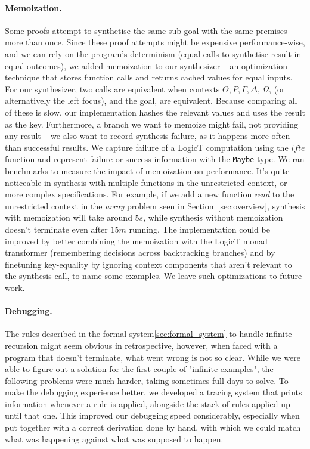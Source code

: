 \documentclass{llncs}
\newcommand{\mypara}[1]{\paragraph{\textbf{#1}.}}
\def\Rho{P}
\begin{document}
\mypara{Memoization} Some proofs attempt to synthetise the same
sub-goal with the same premises more than once. Since these proof
attempts might be expensive performance-wise, and we can rely on the
program's determinism (equal calls to synthetise result in equal
outcomes), we added memoization to our synthesizer -- an optimization
technique that stores function calls and returns cached values for
equal inputs.
%
For our synthesizer, two calls are equivalent when
contexts $\Theta, \Rho, \Gamma, \Delta$, $\Omega$, (or alternatively
the left focus), and the goal, are equivalent. Because comparing all
of these is slow, our implementation hashes the relevant values and
uses the result as the key.
%
Furthermore, a branch we want to memoize
might fail, not providing any result -- we also want to record
synthesis failure, as it happens more often than successful
results. We capture failure of a LogicT computation using the $\mathit{ifte}$
function and represent failure or success information with the \texttt{Maybe}
type. We ran benchmarks to measure the impact of memoization on 
performance. It's quite noticeable in synthesis with multiple
functions in the unrestricted context, or more complex
specifications. For example, if we add a new function \emph{read} to
the unrestricted context in the \emph{array} problem seen in
Section~\ref{sec:overview}, synthesis with memoization will take
around $5s$, while synthesis without memoization doesn't terminate
even after $15m$ running.
%
The implementation could be improved by better combining the
memoization with the LogicT monad transformer (remembering decisions across
backtracking branches) and by finetuning key-equality by ignoring context
components that aren't relevant to the synthesis call, to name some
examples. We leave such optimizations to future work.



\mypara{Debugging} The rules described in the formal
system\ref{sec:formal_system} to handle infinite recursion might seem obvious in
retrospective, however, when faced with a program that doesn't terminate, what
went wrong is not so clear. While we were able to figure out a solution for the
first couple of "infinite examples", the following problems were much harder,
taking sometimes full days to solve. To make the debugging experience better, we
developed a tracing system that prints information whenever a rule is applied,
alongside the stack of rules applied up until that one. This improved our
debugging speed considerably, especially when put together with a correct
derivation done by hand, with which we could match what was happening against
what was supposed to happen.
\end{document}
